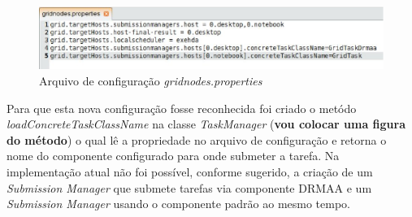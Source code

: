 \begin{figure}[htb]
\begin{center}
\includegraphics[scale=0.5]{./img/gridnodes_properties.eps}
\caption{Arquivo de configuração \emph{gridnodes.properties}}
\label{fig:gridonodes_properties}
\end{center}
\end{figure}

Para que esta nova configuração fosse reconhecida foi criado o metódo \emph{loadConcreteTaskClassName} na classe \emph{TaskManager} (\textbf{vou colocar uma figura do método}) o qual lê a propriedade no arquivo de configuração e retorna o nome do componente configurado para onde submeter a tarefa. Na implementação atual não foi possível, conforme sugerido, a criação de um \emph{Submission Manager} que submete tarefas via componente DRMAA e um \emph{Submission Manager} usando o componente padrão ao mesmo tempo.